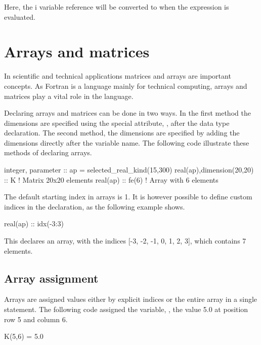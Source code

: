 Here, the i variable reference will be converted to  when the expression is evaluated.

\section{Arrays and matrices}

In scientific and technical applications matrices and arrays are important concepts. As Fortran is a language mainly for
technical computing, arrays and matrices play a vital role in the language.

Declaring arrays and matrices can be done in two ways. In the first method the dimensions are specified using the special attribute, , after the data type declaration. The second method, the dimensions are specified by adding the dimensions directly after the variable name. The following code illustrate these methods of declaring arrays.

\begin{fortrancodeenv}
integer, parameter :: ap = selected_real_kind(15,300)
real(ap),dimension(20,20) :: K ! Matrix 20x20 elements
real(ap) :: fe(6) ! Array with 6 elements
\end{fortrancodeenv}

The default starting index in arrays is 1. It is however possible to define custom indices in the declaration, as the following example shows.

\begin{fortrancodeenv}
real(ap) :: idx(-3:3)
\end{fortrancodeenv}

This declares an array,  with the indices [-3, -2,
-1, 0, 1, 2, 3], which contains 7 elements.

\subsection{Array assignment}

Arrays are assigned values either by explicit indices or the entire array in a single statement. The following code assigned the variable, , the value 5.0 at position row 5 and column 6.

\begin{fortrancodeenv}
K(5,6) = 5.0
\end{fortrancodeenv}

